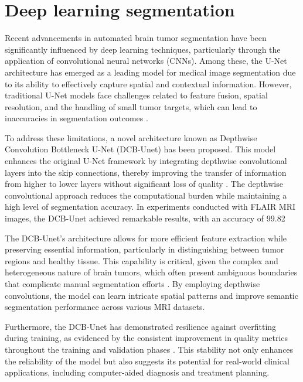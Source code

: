 \documentclass[runningheads]{llncs}
\begin{document}
\section{Deep learning segmentation}
Recent advancements in automated brain tumor segmentation have been significantly influenced by deep learning techniques, particularly through the application of convolutional neural networks (CNNs). Among these, the U-Net architecture has emerged as a leading model for medical image segmentation due to its ability to effectively capture spatial and contextual information. However, traditional U-Net models face challenges related to feature fusion, spatial resolution, and the handling of small tumor targets, which can lead to inaccuracies in segmentation outcomes \cite{Ronneberger_2015, Havaei_2017, Karimzadeh_2021}.

To address these limitations, a novel architecture known as Depthwise Convolution Bottleneck U-Net (DCB-Unet) has been proposed. This model enhances the original U-Net framework by integrating depthwise convolutional layers into the skip connections, thereby improving the transfer of information from higher to lower layers without significant loss of quality \cite{Koh_2020, Akter_2024, Havaei_2017}. The depthwise convolutional approach reduces the computational burden while maintaining a high level of segmentation accuracy. In experiments conducted with FLAIR MRI images, the DCB-Unet achieved remarkable results, with an accuracy of 99.82%

The DCB-Unet's architecture allows for more efficient feature extraction while preserving essential information, particularly in distinguishing between tumor regions and healthy tissue. This capability is critical, given the complex and heterogeneous nature of brain tumors, which often present ambiguous boundaries that complicate manual segmentation efforts \cite{Ding_2019, Sharma_2021, Xu_2024}. By employing depthwise convolutions, the model can learn intricate spatial patterns and improve semantic segmentation performance across various MRI datasets.

Furthermore, the DCB-Unet has demonstrated resilience against overfitting during training, as evidenced by the consistent improvement in quality metrics throughout the training and validation phases \cite{Pavithra_2023, Jena_2023, Joshi_2024}. This stability not only enhances the reliability of the model but also suggests its potential for real-world clinical applications, including computer-aided diagnosis and treatment planning.
\end{document}
